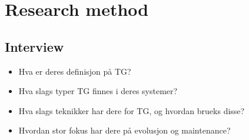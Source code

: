 \chapter{Research method}

\section{Interview}

\begin{itemize}
	\item Hva er deres definisjon på TG?
	\item Hva slags typer TG finnes i deres systemer?
	\item Hva slags teknikker har dere for TG, og hvordan brueks disse?
	\item Hvordan stor fokus har dere på evolusjon og maintenance?


\end{itemize}
